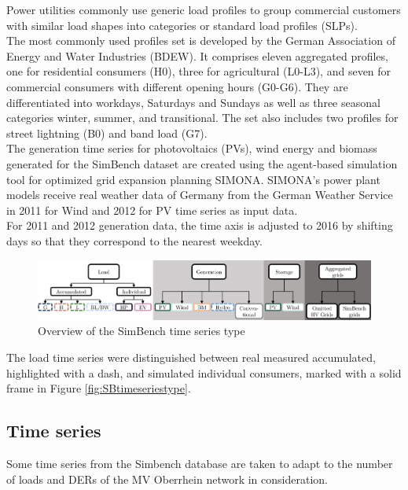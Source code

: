 Power utilities commonly use generic load profiles to group commercial customers with similar load shapes into categories or standard load profiles (\glspl{SLP}). \\
The most commonly used profiles set is developed by the German Association of Energy and Water Industries (\gls{BDEW}). It comprises eleven aggregated profiles, one for residential consumers (H0), three for agricultural (L0-L3), and seven for commercial consumers with different opening hours (G0-G6). They are differentiated into workdays, Saturdays and Sundays as well as three seasonal categories winter, summer, and transitional. The set also includes two profiles for street lightning (B0) and band load (G7). \\
The generation time series for photovoltaics (\glspl{PV}), wind energy and biomass generated for the SimBench dataset are created using the agent-based simulation tool for optimized grid expansion planning SIMONA. SIMONA's power plant models receive real weather data of Germany from the German Weather Service in 2011 for Wind and 2012 for \gls{PV} time series as input data. \\
For 2011 and 2012 generation data, the time axis is adjusted to 2016 by shifting days so that they correspond to the nearest weekday\cite{Simbenchds1}.\\

\begin{figure}[h]
\centering
    \includegraphics[width=.9\linewidth]{images/MVOberr/SimBench time series types.PNG}
\caption[SimBench time series type]{Overview of the SimBench time series type}
\end{figure}

The load time series were distinguished between real measured accumulated, highlighted with a dash, and simulated individual consumers, marked with a solid frame in Figure \ref{fig:SBtimeseriestype}. \\

\subsection{Time series}
\label{ts}
Some time series from the Simbench database are taken to adapt to the number of loads and \glspl{DER} of the MV Oberrhein network in consideration. \\

